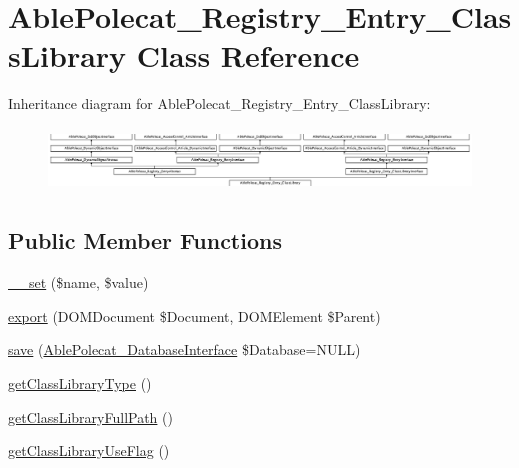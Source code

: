 \hypertarget{class_able_polecat___registry___entry___class_library}{}\section{Able\+Polecat\+\_\+\+Registry\+\_\+\+Entry\+\_\+\+Class\+Library Class Reference}
\label{class_able_polecat___registry___entry___class_library}
Inheritance diagram for Able\+Polecat\+\_\+\+Registry\+\_\+\+Entry\+\_\+\+Class\+Library\+:\begin{figure}[H]
\begin{center}
\leavevmode
\includegraphics[height=1.707317cm]{class_able_polecat___registry___entry___class_library}
\end{center}
\end{figure}
\subsection*{Public Member Functions}
\begin{DoxyCompactItemize}
\item 
\hyperlink{class_able_polecat___registry___entry___class_library_a83c2703c91959192f759992ad5640b67}{\+\_\+\+\_\+set} (\$name, \$value)
\item 
\hyperlink{class_able_polecat___registry___entry___class_library_a0a05b2e4b3a44390eeb042064e427b1a}{export} (D\+O\+M\+Document \$Document, D\+O\+M\+Element \$Parent)
\item 
\hyperlink{class_able_polecat___registry___entry___class_library_a999eef977eb899167ae02f83dd26a4ae}{save} (\hyperlink{interface_able_polecat___database_interface}{Able\+Polecat\+\_\+\+Database\+Interface} \$Database=N\+U\+L\+L)
\item 
\hyperlink{class_able_polecat___registry___entry___class_library_a78da81e3fa32c22602195abcf4c21d3c}{get\+Class\+Library\+Type} ()
\item 
\hyperlink{class_able_polecat___registry___entry___class_library_a826677cf6939d076fd64c902ba6c0217}{get\+Class\+Library\+Full\+Path} ()
\item 
\hyperlink{class_able_polecat___registry___entry___class_library_af40e03caa4b08fe0b0a39031aa87bd81}{get\+Class\+Library\+Use\+Flag} ()
\end{DoxyCompactItemize}
